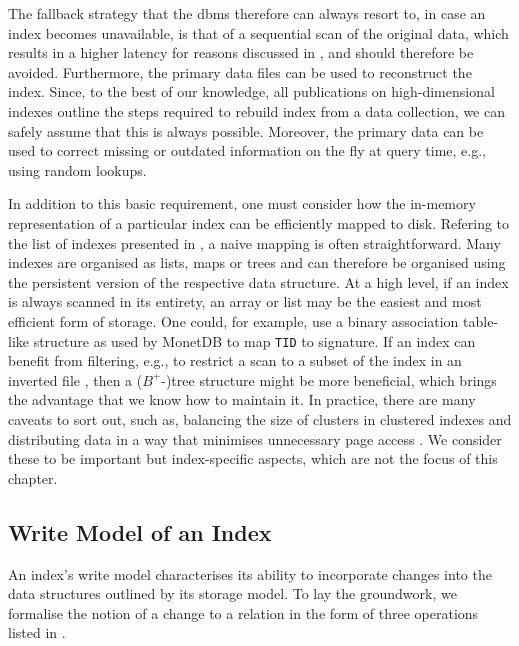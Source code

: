 The fallback strategy that the \acrshort{dbms} therefore can always resort to, in case an index becomes unavailable, is that of a sequential scan of the original data, which results in a higher latency for reasons discussed in , and should therefore be avoided. Furthermore, the primary data files can be used to reconstruct the index. Since, to the best of our knowledge, all publications on high-dimensional indexes outline the steps required to rebuild index from a data collection, we can safely assume that this is always possible. Moreover, the primary data can be used to correct missing or outdated information on the fly at query time, e.g., using random lookups.

In addition to this basic requirement, one must consider how the in-memory representation of a particular index can be efficiently mapped to disk. Refering to the list of indexes presented in , a naive mapping is often straightforward. Many indexes are organised as lists, maps or trees and can therefore be organised using the persistent version of the respective data structure. At a high level, if an index is always scanned in its entirety, an array or list may be the easiest and most efficient form of storage. One could, for example, use a binary association table-like structure as used by MonetDB \cite{Idreos:2012MonetDB} to map \texttt{TID} to signature. If an index can benefit from filtering, e.g., to restrict a scan to a subset of the index in an inverted file \cite{Chierichetti:2007Finding,Gudmundsson:2010Large,Jegou:2010Product}, then a ($B^{+}$-)tree structure might be more beneficial, which brings the advantage that we know how to maintain it. In practice, there are many caveats to sort out, such as, balancing the size of clusters in clustered indexes \cite{Hojsgaard:2019Index} and distributing data in a way that minimises unnecessary page access . We consider these to be important but index-specific aspects, which are not the focus of this chapter.

\subsection{Write Model of an Index}
An index's write model characterises its ability to incorporate changes into the data structures outlined by its storage model. To lay the groundwork, we formalise the notion of a change to a relation in the form of three operations listed in . 

